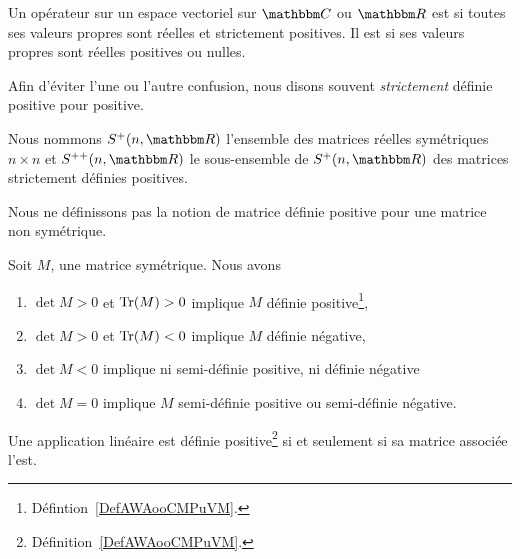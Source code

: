 \begin{definition}    \label{DefAWAooCMPuVM}
    Un opérateur sur un espace vectoriel sur \( \eC\) ou \( \eR\) est  si toutes ses valeurs propres sont réelles et strictement positives.  Il est  si ses valeurs propres sont réelles positives ou nulles.
\end{definition}
Afin d'éviter l'une ou l'autre confusion, nous disons souvent \emph{strictement} définie positive pour positive.

\begin{normaltext}      \label{NORMooAJLHooQhwpvr}
    Nous nommons \( S^+(n,\eR)\) l'ensemble des matrices réelles symétriques \( n\times n\) et \( S^{++}(n,\eR)\) le sous-ensemble de \( S^+(n,\eR)\) des matrices strictement définies positives.
\end{normaltext}

\begin{remark}
    Nous ne définissons pas la notion de matrice définie positive pour une matrice non symétrique.
\end{remark}

\begin{proposition}     \label{PropcnJyXZ}
    Soit $M$, une matrice symétrique. Nous avons
    \begin{enumerate}
        \item       \label{ITEMooTJVQooYmRkas}
            $\det M>0$ et $\operatorname{Tr}(M)>0$ implique $M$ définie positive\footnote{Défintion~\ref{DefAWAooCMPuVM}.},
        \item
        $\det M>0$ et $\operatorname{Tr}(M)<0$ implique $M$ définie négative,
    \item   \label{ItemluuFPN}
        $\det M<0$ implique ni semi-définie positive, ni définie négative
        \item
        $\det M=0$ implique $M$ semi-définie positive ou semi-définie négative.
    \end{enumerate}
\end{proposition}

\begin{proposition}     \label{PROPooUAAFooEGVDRC}
    Une application linéaire est définie positive\footnote{Définition~\ref{DefAWAooCMPuVM}.} si et seulement si sa matrice associée l'est.
\end{proposition}

